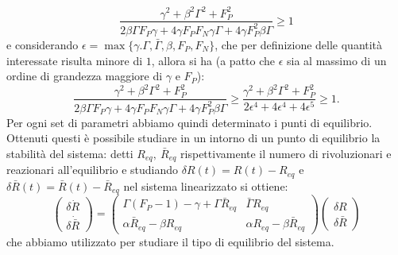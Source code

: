 \begin{equation*}
	\frac{\gamma^2+\beta^2\Gamma^2+F_P^2}{2\beta\Gamma F_P\gamma+4\gamma F_P F_N \gamma{\Gamma}+4\gamma F_P^2\beta \Gamma}\geq1
\end{equation*}
e considerando $\epsilon=\max\{\gamma.\Gamma,\bar{\Gamma},\beta,F_P,F_N\}$, che per definizione delle quantità interessate risulta minore di $1$, allora si ha (a patto che $ \epsilon $ sia al massimo di un ordine di grandezza maggiore di $ \gamma $ e $ F_{P} $):
\begin{equation*}
	\frac{\gamma^2+\beta^2\Gamma^2+F_P^2}{2\beta\Gamma F_P\gamma+4\gamma F_P F_N \gamma{\Gamma}+4\gamma F_P^2\beta \Gamma}\geq\frac{\gamma^2+\beta^2\Gamma^2+F_P^2}{2\epsilon^4+4\epsilon^4+4\epsilon^5}\geq 1.
\end{equation*}
Per ogni set di parametri abbiamo quindi determinato i punti di equilibrio. Ottenuti questi è possibile studiare in un intorno di un punto di equilibrio la stabilità del sistema: detti $R_{eq},\ \bar{R}_{eq}$ rispettivamente il numero di rivoluzionari e reazionari all'equilibrio e studiando $\delta R(t)=R(t)- R_{eq}$ e $\delta \bar{R}(t)=\bar{R}(t)-\bar R_{eq}$ nel sistema linearizzato si ottiene:
\begin{equation}
	\begin{pmatrix}
		\delta \dot{R}\\ 
		\delta \dot{\bar{R}}
	\end{pmatrix}
	=\begin{pmatrix}
		\Gamma(F_P-1)-\gamma+\Gamma \bar{R}_{eq} & \bar{\Gamma}R_{eq}\\
		\alpha\bar{R}_{eq}-\beta R_{eq} & \alpha R_{eq}-\beta \bar{R}_{eq}
	\end{pmatrix}
	\begin{pmatrix}
		\delta R\\
		\delta \bar{R}
	\end{pmatrix}
\end{equation} 
che abbiamo utilizzato per studiare il tipo di equilibrio del sistema.
